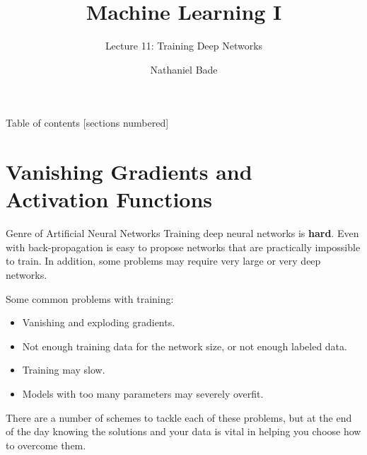 \documentclass[10pt, table, dvipsnames,xcdraw,handout]{beamer}
\title{Machine Learning I}
\subtitle{Lecture 11: Training Deep Networks}
\date{}
\author{Nathaniel Bade}
\institute{Northeastern University Department of Mathematics}
\begin{document}
\maketitle

\begin{frame}{Table of contents}
  [sections numbered]
  \tableofcontents[hideallsubsections]
\end{frame}





\section{Vanishing Gradients and Activation Functions}
\begin{frame}[fragile]{Genre of Artificial Neural Networks}
Training deep neural networks is \textbf{hard}. Even with back-propagation is easy to propose networks that are practically impossible to train. In addition, some problems may require very large or very deep networks.

Some common problems with training:

\begin{itemize}
\item[] Vanishing and exploding gradients.\pause
\item[] Not enough training data for the network size, or not enough labeled data.\pause
\item[] Training may slow.\pause
\item[] Models with too many parameters may severely overfit.
\end{itemize}

There are a number of schemes to tackle each of these problems, but at the end of the day knowing the solutions and your data is vital in helping you choose how to overcome them. 
\end{frame}
\end{document}
